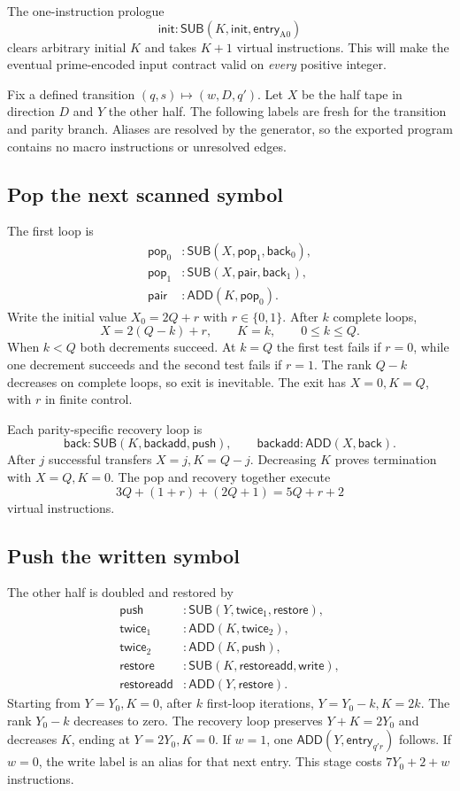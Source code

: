 \documentclass[11pt,letterpaper]{article}
\theoremstyle{definition}
\theoremstyle{remark}
\newcommand{\ADD}{\mathsf{ADD}}
\newcommand{\SUB}{\mathsf{SUB}}
\begin{document}
The one-instruction prologue
\[
 \mathsf{init}:\SUB(K,\mathsf{init},\mathsf{entry}_{\mathrm A0})
\]
clears arbitrary initial $K$ and takes $K+1$ virtual instructions. This will make the eventual prime-encoded input contract valid on \emph{every} positive integer.

Fix a defined transition $(q,s)\mapsto(w,D,q')$. Let $X$ be the half tape in direction $D$ and $Y$ the other half. The following labels are fresh for the transition and parity branch. Aliases are resolved by the generator, so the exported program contains no macro instructions or unresolved edges.

\subsection{Pop the next scanned symbol}
The first loop is
\begin{align*}
 \mathsf{pop}_0&:\SUB(X,\mathsf{pop}_1,\mathsf{back}_0),\\
 \mathsf{pop}_1&:\SUB(X,\mathsf{pair},\mathsf{back}_1),\\
 \mathsf{pair}&:\ADD(K,\mathsf{pop}_0).
\end{align*}
Write the initial value $X_0=2Q+r$ with $r\in\{0,1\}$. After $k$ complete loops,
\[
 X=2(Q-k)+r,\qquad K=k,\qquad 0\leq k\leq Q.
\]
When $k<Q$ both decrements succeed. At $k=Q$ the first test fails if $r=0$, while one decrement succeeds and the second test fails if $r=1$. The rank $Q-k$ decreases on complete loops, so exit is inevitable. The exit has $X=0,K=Q$, with $r$ in finite control.

Each parity-specific recovery loop is
\[
 \mathsf{back}:\SUB(K,\mathsf{backadd},\mathsf{push}),\qquad
 \mathsf{backadd}:\ADD(X,\mathsf{back}).
\]
After $j$ successful transfers $X=j,K=Q-j$. Decreasing $K$ proves termination with $X=Q,K=0$. The pop and recovery together execute
\[
 3Q+(1+r)+(2Q+1)=5Q+r+2
\]
virtual instructions.

\subsection{Push the written symbol}
The other half is doubled and restored by
\begin{align*}
 \mathsf{push}&:\SUB(Y,\mathsf{twice}_1,\mathsf{restore}),\\
 \mathsf{twice}_1&:\ADD(K,\mathsf{twice}_2),\\
 \mathsf{twice}_2&:\ADD(K,\mathsf{push}),\\
 \mathsf{restore}&:\SUB(K,\mathsf{restoreadd},\mathsf{write}),\\
 \mathsf{restoreadd}&:\ADD(Y,\mathsf{restore}).
\end{align*}
Starting from $Y=Y_0,K=0$, after $k$ first-loop iterations,
$Y=Y_0-k,K=2k$. The rank $Y_0-k$ decreases to zero. The recovery loop preserves $Y+K=2Y_0$ and decreases $K$, ending at $Y=2Y_0,K=0$. If $w=1$, one $\ADD(Y,\mathsf{entry}_{q'r})$ follows. If $w=0$, the write label is an alias for that next entry. This stage costs $7Y_0+2+w$ instructions.
\end{document}
